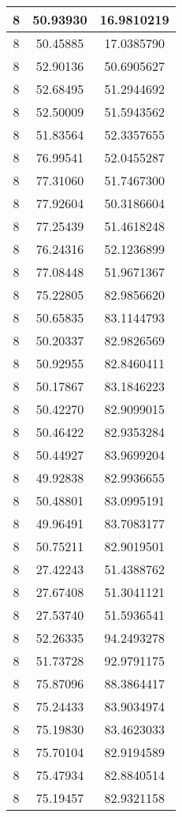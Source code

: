 \documentclass[
]{book}
\begin{document}
\begin{tabular}{c|c|c}
\hline
8 & 50.93930 & 16.9810219\\
\hline
8 & 50.45885 & 17.0385790\\
\hline
8 & 52.90136 & 50.6905627\\
\hline
8 & 52.68495 & 51.2944692\\
\hline
8 & 52.50009 & 51.5943562\\
\hline
8 & 51.83564 & 52.3357655\\
\hline
8 & 76.99541 & 52.0455287\\
\hline
8 & 77.31060 & 51.7467300\\
\hline
8 & 77.92604 & 50.3186604\\
\hline
8 & 77.25439 & 51.4618248\\
\hline
8 & 76.24316 & 52.1236899\\
\hline
8 & 77.08448 & 51.9671367\\
\hline
8 & 75.22805 & 82.9856620\\
\hline
8 & 50.65835 & 83.1144793\\
\hline
8 & 50.20337 & 82.9826569\\
\hline
8 & 50.92955 & 82.8460411\\
\hline
8 & 50.17867 & 83.1846223\\
\hline
8 & 50.42270 & 82.9099015\\
\hline
8 & 50.46422 & 82.9353284\\
\hline
8 & 50.44927 & 83.9699204\\
\hline
8 & 49.92838 & 82.9936655\\
\hline
8 & 50.48801 & 83.0995191\\
\hline
8 & 49.96491 & 83.7083177\\
\hline
8 & 50.75211 & 82.9019501\\
\hline
8 & 27.42243 & 51.4388762\\
\hline
8 & 27.67408 & 51.3041121\\
\hline
8 & 27.53740 & 51.5936541\\
\hline
8 & 52.26335 & 94.2493278\\
\hline
8 & 51.73728 & 92.9791175\\
\hline
8 & 75.87096 & 88.3864417\\
\hline
8 & 75.24433 & 83.9034974\\
\hline
8 & 75.19830 & 83.4623033\\
\hline
8 & 75.70104 & 82.9194589\\
\hline
8 & 75.47934 & 82.8840514\\
\hline
8 & 75.19457 & 82.9321158\\

\end{tabular}
\end{document}
